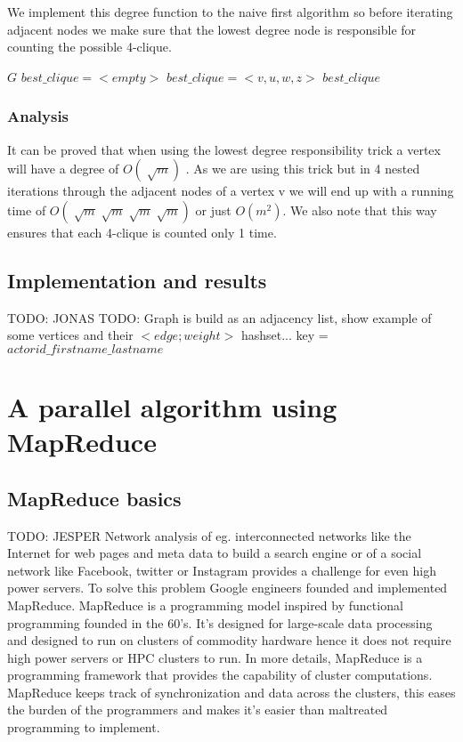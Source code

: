 \documentclass{article}
\begin{document}
We implement this degree function to the naive first algorithm so before iterating adjacent nodes we make sure that the lowest degree node is responsible for counting the possible 4-clique.

\begin{algorithm}
\caption{$strong\_4clique\_finder++$}
\begin{algorithmic}
\REQUIRE $G$
\STATE $best\_clique = <empty>$
\STATE $best\_clique = <v,u,w,z>$
\ENDIF
\ENDIF
\ENDFOR
\ENDIF
\ENDFOR
\ENDIF
\ENDFOR
\ENDFOR
\RETURN $best\_clique$
\end{algorithmic}
\end{algorithm}

\subsubsection{Analysis}
It can be proved that when using the lowest degree responsibility trick a vertex will have a degree of $O(\sqrt[]{m})$ \cite{AlgorithmicAspects}. As we are using this trick but in 4 nested iterations through the adjacent nodes of a vertex v we will end up with a running time of $O(\sqrt[]{m}\sqrt[]{m}\sqrt[]{m}\sqrt[]{m})$ or just $O(m^{2})$. We also note that this way ensures that each 4-clique is counted only 1 time.


\subsection{Implementation and results}
TODO: JONAS
TODO: Graph is build as an adjacency list, show example of some vertices and their $<edge;weight>$ hashset...
key = $actorid\_firstname\_lastname$

\section{A parallel algorithm using MapReduce}

\subsection{MapReduce basics}
TODO: JESPER
Network analysis of eg. interconnected networks like the Internet for web pages and meta data to build a search engine or of a social network like Facebook, twitter or Instagram provides a challenge for even high power servers. To solve this problem Google engineers founded and implemented MapReduce. MapReduce is a programming model inspired by functional programming founded in the 60's. It's designed for large-scale data processing and designed to run on clusters of commodity hardware hence it does not require high power servers or HPC clusters to run.
In more details, MapReduce is a programming framework that provides the capability of cluster computations. MapReduce keeps track of synchronization and data across the clusters, this eases the burden of the programmers and makes it's easier than maltreated programming to implement.
\end{document}
